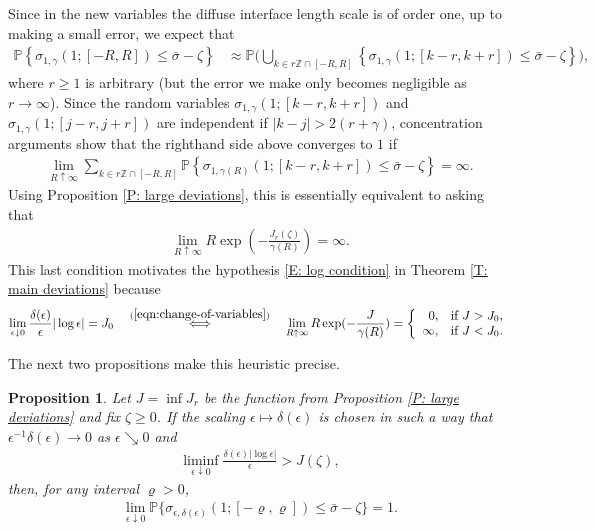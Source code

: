 \documentclass[12pt]{amsart}
\newtheorem{prop}{Proposition}
\begin{document}
Since in the new variables the diffuse interface length scale is of order one, up to making a small error, we expect that
	\begin{align*}
		\mathbb{P} \left\{ \sigma_{1,\gamma}(1;[-R,R]) \leq \bar{\sigma} - \zeta \right\}
			&\approx \mathbb{P} \big( \bigcup_{k \in r \mathbb{Z} \cap [-R,R]} \left\{ \sigma_{1,\gamma}(1;[k-r,k+r]) \leq \bar{\sigma} - \zeta \right\} \big) ,
	\end{align*} 
where $ r \geq 1$ is arbitrary (but the error we make only becomes negligible as $ r \to \infty$). Since the random variables $\sigma_{1,\gamma}(1;[k-r,k+r])$ and $\sigma_{1,\gamma}(1;[j-r,j+r])$ are independent if $|k - j| > 2 ( r + \gamma )$, concentration arguments show that the righthand side above converges to $1$ if
	\begin{align*}
		\lim_{ R \uparrow \infty } \sum_{ k \in r \mathbb{Z} \cap [-R,R]} \mathbb{P} \left\{ \sigma_{1,\gamma(R)}(1;[k-r,k+r]) \leq \bar{\sigma} - \zeta \right\} = \infty .
	\end{align*}
Using Proposition \ref{P: large deviations}, this is essentially equivalent to asking that
	\begin{align*}
		\lim_{ R \uparrow \infty } R \exp ( - \frac{ J_{r}(\zeta) }{ \gamma(R) } ) = \infty .
	\end{align*}
This last condition motivates the hypothesis \eqref{E: log condition} in Theorem \ref{T: main deviations} because
	\begin{align}\label{eqn:limit-condition-ed-to-gr}
		\lim_{ \epsilon \downarrow 0 } \frac{ \delta ( \epsilon ) }{ \epsilon } | \log \epsilon | = J_{0}
		\quad \stackrel{(\ref{eqn:change-of-variables})}{\iff} \quad
		\lim_{ R \uparrow \infty } R \exp ( - \frac{ J }{ \gamma(R) } )  = \left\{ \begin{array}{r l}
            0, & \text{if} \, \, J > J_{0} , \\
            \infty , & \text{if} \, \, J < J_{0} .
        \end{array} \right.
	\end{align}
	
The next two propositions make this heuristic precise.

	\medskip

	\begin{prop} \label{P: lower deviations} Let $J = \inf J_{r}$ be the function from Proposition \ref{P: large deviations} and fix $\zeta \geq 0$.  If the scaling $\epsilon \mapsto \delta(\epsilon)$ is chosen in such a way that $\epsilon^{-1} \delta(\epsilon) \to 0$ as $\epsilon \searrow 0$ and 
		\begin{align}\label{E: assumption about delta}
			\liminf_{ \epsilon \downarrow 0} \frac{ \delta(\epsilon)  | \log \epsilon | }{ \epsilon }> J( \zeta ),
		\end{align}
	then, for any interval $ \varrho >  0 $,
		\begin{align*}
			\lim_{ \epsilon \downarrow 0 } \mathbb{P} \{ \sigma_{\epsilon,\delta(\epsilon)}(1; [ - \varrho , \varrho ] ) \leq \bar{\sigma} - \zeta \} = 1.
		\end{align*}
	\end{prop}
\end{document}
